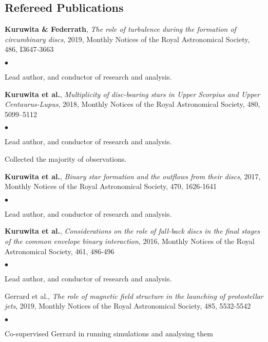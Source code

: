 \documentclass[margin,line]{res}
\newenvironment{list1}{
	\begin{list}{\ding{113}}{%
			\setlength{\itemsep}{0in}
			\setlength{\parsep}{0in} \setlength{\parskip}{0in}
			\setlength{\topsep}{0in} \setlength{\partopsep}{0in} 
			\setlength{\leftmargin}{0.17in}}}{\end{list}}
\newenvironment{list2}{
	\begin{list}{$\bullet$}{%
			\setlength{\itemsep}{0in}
			\setlength{\parsep}{0in} \setlength{\parskip}{0in}
			\setlength{\topsep}{0in} \setlength{\partopsep}{0in} 
			\setlength{\leftmargin}{0.2in}}}{\end{list}}
\begin{document}
\begin{resume}
\section{\sc Refereed Publications}
\begin{list1}
	\item[] {\bf Kuruwita \& Federrath}, \emph{The role of turbulence during the formation of circumbinary discs}, 2019, Monthly Notices of the Royal Astronomical Society, 486, I3647-3663
	\begin{list2}
		\item Lead author, and conductor of research and analysis.\\
	\end{list2}
	\item[] {\bf Kuruwita et al.}, \emph{Multiplicity of disc-bearing stars in Upper Scorpius and Upper Centaurus-Lupus}, 2018, Monthly Notices of the Royal Astronomical Society, 480, 5099–5112
	\begin{list2}
		\item Lead author, and conductor of research and analysis.
		\item Collected the majority of observations.\\
	\end{list2}
	\item[] {\bf Kuruwita et al.}, \emph{Binary star formation and the outflows from their discs}, 2017, Monthly Notices of the Royal Astronomical Society, 470, 1626-1641
	\begin{list2}
		\item Lead author, and conductor of research and analysis.\\
	\end{list2}
	\item[] {\bf Kuruwita et al.}, \emph{Considerations on the role of fall-back discs in the final stages of the common envelope binary interaction}, 2016, Monthly Notices of the Royal Astronomical Society, 461, 486-496
	\begin{list2}
		\item Lead author, and conductor of research and analysis.\\
	\end{list2}
	\item[] Gerrard et al., \emph{The role of magnetic field structure in the launching of protostellar jets}, 2019, Monthly Notices of the Royal Astronomical Society, 485, 5532-5542
	\begin{list2}
		\item Co-supervised Gerrard in running simulations and analysing them\\

\end{list2}
\end{list1}
\end{resume}
\end{document}
